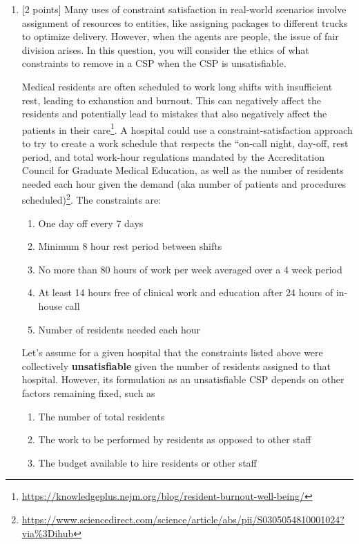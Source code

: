 \documentclass{article}
\theoremstyle{case}
\theoremstyle{definition}
\begin{document}
\begin{enumerate}[label=\alph*.]
\item
{[2 points]}
Many uses of constraint satisfaction in real-world scenarios involve assignment of resources to entities, like assigning packages to different trucks to optimize delivery. However, when the agents are people, the issue of fair division arises. In this question, you will consider the ethics of what constraints to remove in a CSP when the CSP is unsatisfiable.

Medical residents are often scheduled to work long shifts with insufficient rest, leading to exhaustion and burnout. This can negatively affect the residents and potentially lead to mistakes that also negatively affect the patients in their care\footnote{\url{https://knowledgeplus.nejm.org/blog/resident-burnout-well-being/}}. A hospital could use a constraint-satisfaction approach to try to create a work schedule that respects the “on-call night, day-off, rest period, and total work-hour regulations mandated by the Accreditation Council for Graduate Medical Education, as well as the number of residents needed each hour given the demand (aka number of patients and procedures scheduled)\footnote{\url{https://www.sciencedirect.com/science/article/abs/pii/S0305054810001024?via\%3Dihub}}. The constraints are:
\begin{enumerate}[label=\arabic*.]
\item  One day off every 7 days 
\item  Minimum 8 hour rest period between shifts 
\item  No more than 80 hours of work per week averaged over a 4 week period 
\item  At least 14 hours free of clinical work and education after 24 hours of in-house call 
\item  Number of residents needed each hour 
\end{enumerate}
 Let’s assume for a given hospital that the constraints listed above were collectively \textbf{unsatisfiable} given the number of residents assigned to that hospital. However, its formulation as an unsatisfiable CSP depends on other factors remaining fixed, such as 
\begin{enumerate}[label=\Alph*.]
\item The number of total residents
\item The work to be performed by residents as opposed to other staff
\item  The budget available to hire residents or other staff 
\end{enumerate}


\end{enumerate}
\end{document}
